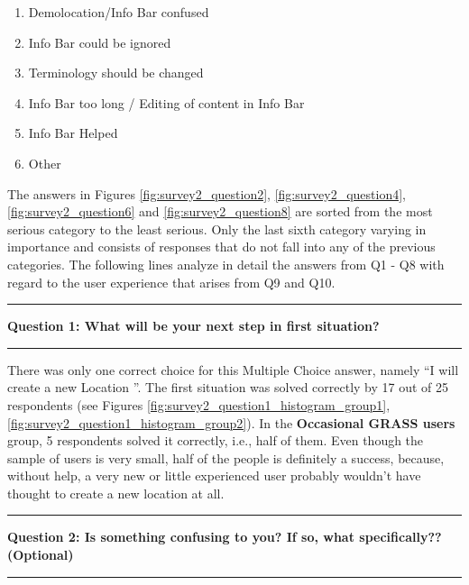 \documentclass[a4paper,10pt,twoside]{article}
\begin{document}
\begin{enumerate}
\item Demolocation/Info Bar confused
\item Info Bar could be ignored
\item Terminology should be changed
\item Info Bar too long / Editing of content in Info Bar
\item Info Bar Helped
\item Other
\end{enumerate}

\noindent The answers in Figures \ref{fig:survey2_question2}, \ref{fig:survey2_question4}, \ref{fig:survey2_question6} and \ref{fig:survey2_question8} are sorted from the most serious category to the least serious. Only the last sixth category varying in importance and consists of responses that do not fall into any of the previous categories. The following lines analyze in detail the answers from Q1 - Q8 with regard to the user experience that arises from Q9 and Q10.

\par\noindent\rule{\textwidth}{0.4pt}
\noindent \textbf{Question 1: What will be your next step in first situation?}
\par\noindent\rule{\textwidth}{0.4pt}

\noindent There was only one correct choice for this Multiple Choice answer, namely ``I will create a new Location ''. The first situation was solved correctly by 17 out of 25 respondents (see Figures \ref{fig:survey2_question1_histogram_group1}, \ref{fig:survey2_question1_histogram_group2}). In the \textbf{Occasional GRASS users} group, 5 respondents solved it correctly, i.e., half of them. Even though the sample of users is very small, half of the people is definitely a success, because, without help, a very new or little experienced user probably wouldn't have thought to create a new location at all.

\par\noindent\rule{\textwidth}{0.4pt}
\noindent \textbf{Question 2: Is something confusing to you? If so, what specifically?? (Optional)}
\par\noindent\rule{\textwidth}{0.4pt}
\end{document}
